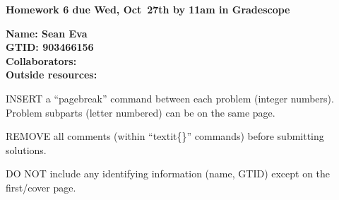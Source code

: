 \documentclass[11pt]{article}
\begin{document}
{\noindent\Large\textbf{Homework 6 due Wed, Oct~27th by 11am in Gradescope}}

\vspace{.25in}

{\large
\noindent
\textbf{Name: Sean Eva} \smallskip \\
\textbf{GTID: 903466156} \smallskip \\
\textbf{Collaborators:} \smallskip \\
\textbf{Outside resources:} \smallskip
}

\pagebreak 


INSERT a ``pagebreak'' command between each problem (integer numbers).
Problem subparts (letter numbered) can be on the same page.

REMOVE all comments (within ``textit\{\}'' commands) before submitting
solutions.

DO NOT include any identifying information (name, GTID) except on the
first/cover page.
\end{document}
